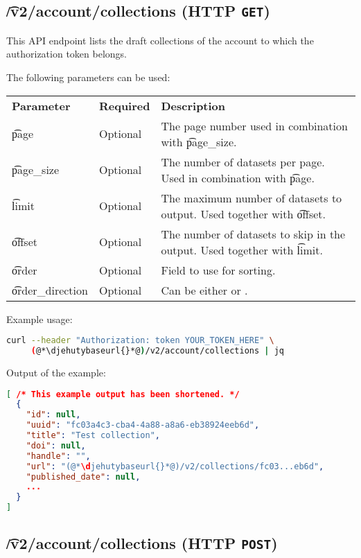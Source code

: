 \subsection{\t{/v2/account/collections} (HTTP \texttt{GET})}

  This API endpoint lists the draft collections of the account to which the
  authorization token belongs.

  The following parameters can be used:

\begin{tabularx}{\textwidth}{*{2}{!{\VRule[-1pt]}l}!{\VRule[-1pt]}X}
  \headrow
  \textbf{Parameter}   & \textbf{Required} & \textbf{Description}\\
  \t{page}             & Optional & The page number used in combination with
                                    \t{page\_size}.\\
  \t{page\_size}       & Optional & The number of datasets per page.  Used
                                    in combination with \t{page}.\\
  \t{limit}            & Optional & The maximum number of datasets to output.
                                    Used together with \t{offset}.\\
  \t{offset}           & Optional & The number of datasets to skip in the
                                    output.  Used together with \t{limit}.\\
  \t{order}            & Optional & Field to use for sorting.\\
  \t{order\_direction} & Optional & Can be either  or .\\
\end{tabularx}

  Example usage:
\begin{lstlisting}[language=bash]
curl --header "Authorization: token YOUR_TOKEN_HERE" \
     (@*\djehutybaseurl{}*@)/v2/account/collections | jq
\end{lstlisting}

  Output of the example:
\begin{lstlisting}[language=JSON]
[ /* This example output has been shortened. */
  {
    "id": null,
    "uuid": "fc03a4c3-cba4-4a88-a8a6-eb38924eeb6d",
    "title": "Test collection",
    "doi": null,
    "handle": "",
    "url": "(@*\djehutybaseurl{}*@)/v2/collections/fc03...eb6d",
    "published_date": null,
    ...
  }
]
\end{lstlisting}

\subsection{\t{/v2/account/collections} (HTTP \texttt{POST})}

